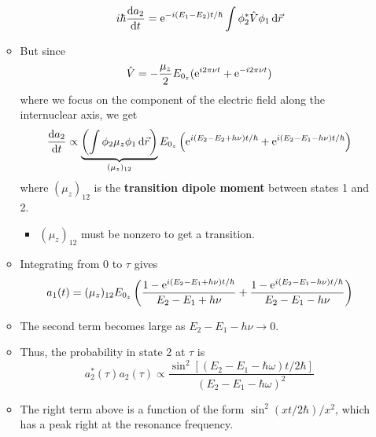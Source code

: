 \documentclass[../notes.tex]{subfiles}
\begin{document}
\begin{itemize}
\begin{itemize}
        \begin{equation*}
            i\hbar\dv{a_2}{t} = \e[-i(E_1-E_2)t/\hbar]\int\phi_2^*\hat{V}\phi_1\dd{\vec{r}}
        \end{equation*}
        \item But since
        \begin{equation*}
            \hat{V} = -\frac{\mu_z}{2}E_{0_z}(\e[i2\pi\nu t]+\e[-i2\pi\nu t])
        \end{equation*}
        where we focus on the component of the electric field along the internuclear axis, we get
        \begin{equation*}
            \dv{a_2}{t} \propto \underbrace{\left( \int\phi_2\mu_z\phi_1\dd{\vec{r}} \right)}_{(\mu_z)_{12}}E_{0_z}\left( \e[i(E_2-E_2+h\nu)t/\hbar]+\e[i(E_2-E_1-h\nu)t/\hbar] \right)
        \end{equation*}
        where $(\mu_z)_{12}$ is the \textbf{transition dipole moment} between states 1 and 2.
        \begin{itemize}
            \item $(\mu_z)_{12}$ must be nonzero to get a transition.
        \end{itemize}
        \item Integrating from 0 to $\tau$ gives
        \begin{equation*}
            a_1(t) = (\mu_z)_{12}E_{0_z}\left( \frac{1-\e[i(E_2-E_1+h\nu)t/\hbar]}{E_2-E_1+h\nu}+\frac{1-\e[i(E_2-E_1-h\nu)t/\hbar]}{E_2-E_1-h\nu} \right)
        \end{equation*}
        \item The second term becomes large as $E_2-E_1-h\nu\to 0$.
        \item Thus, the probability in state 2 at $\tau$ is
        \begin{equation*}
            a_2^*(\tau)a_2(\tau) \propto \frac{\sin^2[(E_2-E_1-\hbar\omega)t/2\hbar]}{(E_2-E_1-\hbar\omega)^2}
        \end{equation*}
        \item The right term above is a function of the form $\sin^2(xt/2\hbar)/x^2$, which has a peak right at the resonance frequency.
        \begin{figure}[H]
            \centering
\end{figure}
\end{itemize}
\end{itemize}
\end{document}
